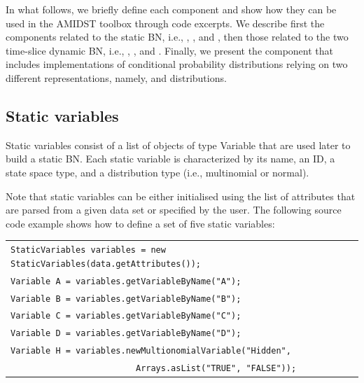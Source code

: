 In what follows, we briefly define each component and show how they can be used in the AMIDST toolbox through code excerpts. We describe first the components related to the static BN, i.e., , , and , then those related to the two time-slice dynamic BN, i.e., , , and . Finally, we present the  component that includes implementations of conditional probability distributions relying on two different representations, namely,  and  distributions. 

\subsection{Static variables}

Static variables consist of a list of objects of type Variable that are used later to build a static BN. Each static variable is characterized by its name, an ID, a state space type, and a distribution type (i.e., multinomial or normal). 

Note that static variables can be either initialised using the list of attributes that are parsed from a given data set or specified by the user. The following source code example shows how to define a set of five static variables:

\vspace{-0.1in}
\begin{table}[H]
\begin{tabular}{l} \\ \hline

        \texttt{StaticVariables variables = new StaticVariables(data.getAttributes());}\\

        \texttt{Variable A = variables.getVariableByName("A");}\\
        \texttt{Variable B = variables.getVariableByName("B");}\\
        \texttt{Variable C = variables.getVariableByName("C");}\\
        \texttt{Variable D = variables.getVariableByName("D");}\\

        \texttt{Variable H = variables.newMultionomialVariable("Hidden",}\\ \texttt{~~~~~~~~~~~~~~~~~~~~~~~~~Arrays.asList("TRUE", "FALSE"));}\\ \hline 

\end{tabular}
\end{table}


